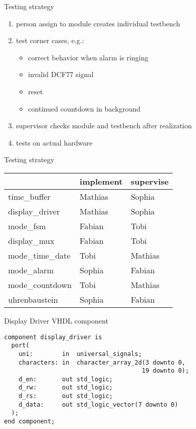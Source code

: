 \documentclass{beamer}
\begin{document}
\begin{frame}{Testing strategy}
	\begin{enumerate}
		\item person assign to module creates individual testbench
		\item test corner cases, e.g.: \begin{itemize}
			\item correct behavior when alarm is ringing
			\item invalid DCF77 signal
			\item reset
			\item continued countdown in background
		\end{itemize}
		\item supervisor checks module and testbench after realization
		\item tests on actual hardware
	\end{enumerate}
\end{frame}

\begin{frame}{Testing strategy}
	\begin{center}
		\begin{tabular}{lll}
			\toprule
									& implement   & supervise  \\ \midrule
			time\_buffer      & Mathias     & Sophia     \\
			display\_driver   & Mathias     & Sophia     \\
			mode\_fsm         & Fabian      & Tobi       \\
			display\_mux      & Fabian      & Tobi       \\
			mode\_time\_date  & Tobi        & Mathias    \\
			mode\_alarm       & Sophia      & Fabian     \\
			mode\_countdown   & Tobi        & Mathias    \\
			uhrenbaustein     & Sophia      & Fabian     \\ \bottomrule
		\end{tabular}
	\end{center}
\end{frame}

\begin{frame}[fragile]{Display Driver VHDL component}
\begin{verbatim}
component display_driver is
  port(
    uni:        in  universal_signals;
    characters: in  character_array_2d(3 downto 0,
                                      19 downto 0);
    d_en:       out std_logic;
    d_rw:       out std_logic;
    d_rs:       out std_logic;
    d_data:     out std_logic_vector(7 downto 0)
  );
end component;
\end{verbatim}
\end{frame}
\end{document}

